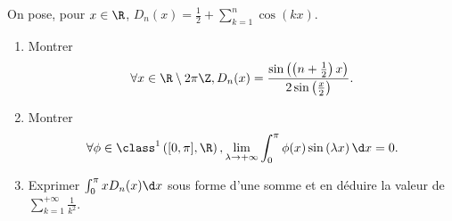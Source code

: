 \begin{enonce}
\begin{exercise}[ID={RMS127 E724},subtitle={Mines-Ponts PSI 2016},tags={}, difficulty={0}]
  On pose, pour $x\in\R$, $D_n(x) = \frac12 + \sum\limits_{k=1}^n \cos(kx)$.
  \begin{enumerate}
    \item Montrer
      \begin{equation*}
        \forall x\in\R\setminus 2\pi\Z, D_n(x) = \frac{\sin\left( \left( n+\frac12 \right) x \right)}{2\sin\left( \frac x2 \right)}.
      \end{equation*}

    \item 
      Montrer
      \begin{equation*}
        \forall\phi\in\class^1\left( [0,\pi], \R \right), \lim_{\lambda\to+\infty} \int_0^\pi \phi(x) \sin\left( \lambda x \right) \d x = 0.
      \end{equation*}

    \item 
      Exprimer $\int_0^\pi xD_n(x) \d x$ sous forme d'une somme et en déduire la valeur de $\sum\limits_{k=1}^{+\infty} \frac{1}{k^2}$.
      
  \end{enumerate}
\end{exercise}
\begin{solution}

\end{solution}
\end{enonce}
